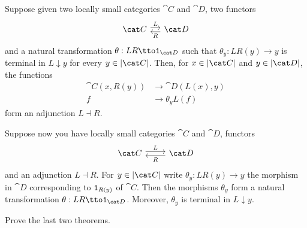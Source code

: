 
\begin{proposition}
Suppose given two locally small categories \(\cat C\) and \(\cat D\), two functors
\[\begin{tikzcd}[column sep=small]
\cat C \ar["L", r, shift left] & \cat D \ar["R", l, shift left]
\end{tikzcd}\]
and a natural transformation \(\theta : LR \tto \id_{\cat D}\) such that \(\theta_y : LR(y) \to y\) is terminal in \(L {\downarrow} y\) for every \(y \in \obj{\cat C}\).  Then, for \(x \in \obj{\cat C}\) and \(y \in \obj{\cat D}\), the functions
\begin{align*}
\cat C(x, R(y)) & \to \cat D(L(x), y) \\
f &\to \theta_y L(f)
\end{align*}
form an adjunction \(L \dashv R\).
\end{proposition}


\begin{proposition}
Suppose now you have locally small categories \(\cat C\) and \(\cat D\), functors
\[\begin{tikzcd}
\cat C \ar["L", r, shift left] & \cat D \ar["R", l, shift left]
\end{tikzcd}\]
and an adjunction \(L \dashv R\). For \(y \in \obj{\cat C}\) write \(\theta_y : LR(y) \to y\) the morphism in \(\cat D\) corresponding to \(\mathtt 1_{R(y)}\) of \(\cat C\). Then the morphisms \(\theta_y\) form a natural transformation \(\theta : LR \tto \id_{\cat D}\). Moreover, \(\theta_y\) is terminal in \(L {\downarrow} y\).
\end{proposition}

\begin{exercise}
Prove the last two theorems.
\end{exercise}

